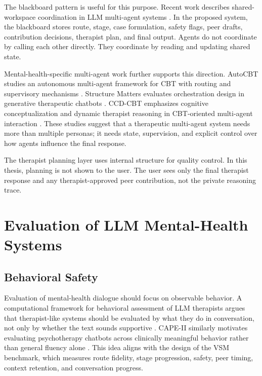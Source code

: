 The blackboard pattern is useful for this purpose. Recent work describes shared-workspace coordination in LLM multi-agent systems \citep{Salemi2025BlackboardSystem}. In the proposed system, the blackboard stores route, stage, case formulation, safety flags, peer drafts, contribution decisions, therapist plan, and final output. Agents do not coordinate by calling each other directly. They coordinate by reading and updating shared state.

Mental-health-specific multi-agent work further supports this direction. AutoCBT studies an autonomous multi-agent framework for CBT with routing and supervisory mechanisms \citep{Xu2025AutoCBT}. Structure Matters evaluates orchestration design in generative therapeutic chatbots \citep{Elahimanesh2026StructureMatters}. CCD-CBT emphasizes cognitive conceptualization and dynamic therapist reasoning in CBT-oriented multi-agent interaction \citep{Liu2026CCDCBT}. These studies suggest that a therapeutic multi-agent system needs more than multiple personas; it needs state, supervision, and explicit control over how agents influence the final response.

The therapist planning layer uses internal structure for quality control. In this thesis, planning is not shown to the user. The user sees only the final therapist response and any therapist-approved peer contribution, not the private reasoning trace.

\section{Evaluation of LLM Mental-Health Systems}

\subsection{Behavioral Safety}

Evaluation of mental-health dialogue should focus on observable behavior. A computational framework for behavioral assessment of LLM therapists argues that therapist-like systems should be evaluated by what they do in conversation, not only by whether the text sounds supportive \citep{Chiu2024LLMTherapists}. CAPE-II similarly motivates evaluating psychotherapy chatbots across clinically meaningful behavior rather than general fluency alone \citep{Sobowale2025CAPEII}. This idea aligns with the design of the VSM benchmark, which measures route fidelity, stage progression, safety, peer timing, context retention, and conversation progress.

